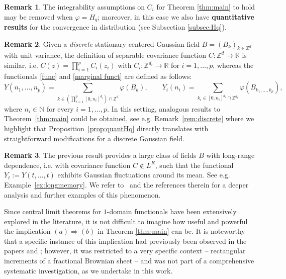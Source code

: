 \documentclass[12pt]{article}
\DeclareMathOperator{\1}{1}
\newcommand{\R}{\mathbb{R}}
\newcommand{\Z}{\mathbb{Z}}
\theoremstyle{plain}
\theoremstyle{definition}
\newtheorem{remark}{Remark}
\begin{document}
\begin{remark}
    The integrability assumptions on $C_i$ for Theorem \ref{thm:main} to hold may be removed when $\varphi=H_q$; moreover, in this case we also have \textbf{quantitative results} for the convergence in distribution (see Subsection \ref{subsec:Hq}).
\end{remark}

\begin{remark}
    Given a {\it discrete} stationary centered Gaussian field $B=(B_k)_{k\in \mathbb Z^d}$ with unit variance, the definition of separable covariance function $C:\mathbb Z^d \to \R$ is similar, i.e. $
        C(z) = \prod_{i=1}^p C_i(z_i)$ with $C_i:\Z^{d_i}\to \R$ for $i=1,\ldots,p$, whereas the functionals \eqref{func} and \eqref{marginal funct} are defined as follows:
    \[
    Y(n_1,\dots,n_p)=\sum_{k\in (\prod_{i=1}^p[0,n_i]^{d_i})\cap \mathbb Z^{d}}\varphi(B_{k}), \quad \quad Y_i(n_i)=\sum_{k_i\in  [0,n_i]^{d_i}\cap \mathbb Z^{d_i}}\varphi(B_{k_1,\dots,k_p}),
    \]
    where $n_i\in \mathbb N$ for every $i=1,\ldots,p$. In this setting, analogous results to Theorem~\ref{thm:main} could be obtained, see e.g. Remark~\ref{rem:discrete} where we highlight that Proposition~\ref{prop:quantHq} directly translates with straightforward modifications for a discrete Gaussian field.  
\end{remark}

\begin{remark}
    The previous result provides a large class of fields $B$ with long-range dependence, i.e. with covariance function $C\notin L^R$, such that the functional $Y_t:= Y(t,\ldots,t)$ exhibits Gaussian fluctuations around its mean. See e.g. Example~\ref{ex:longmemory}. We refer to~\cite{MN22} and the references therein for a deeper analysis and further examples of this phenomenon. 
\end{remark}
    
Since central limit theorems for $1$-domain functionals have been extensively explored in the literature, it is not difficult to imagine how useful and powerful the implication $(a)\Rightarrow (b)$ in Theorem \ref{thm:main} can be.
It is noteworthy that a specific instance of this implication had previously been observed in the papers \cite{RST} and \cite{PR16}; however, it was restricted to a very specific context -- rectangular increments of a fractional Brownian sheet -- and was not part of a comprehensive systematic investigation, as we undertake in this work.

\vspace{0.25cm}
\end{document}
